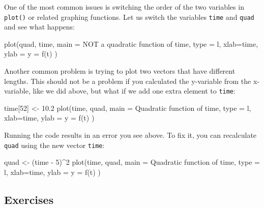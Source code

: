 \documentclass[
  letterpaper,
  DIV=11,
  numbers=noendperiod]{scrreprt}
\newenvironment{Shaded}{\begin{snugshade}}{\end{snugshade}}
\newcommand{\NormalTok}[1]{\textcolor[rgb]{0.00,0.23,0.31}{#1}}
\begin{document}
One of the most common issues is switching the order of the two
variables in \texttt{plot()} or related graphing functions. Let us
switch the variables \texttt{time} and \texttt{quad} and see what
happens:

\begin{Shaded}
\begin{Highlighting}[]
\NormalTok{plot(quad, time, main = \textquotesingle{}NOT a quadratic function of time\textquotesingle{}, type = \textquotesingle{}l\textquotesingle{}, xlab=\textquotesingle{}time\textquotesingle{}, ylab = \textquotesingle{}y = f(t)\textquotesingle{} )}
\end{Highlighting}
\end{Shaded}

Another common problem is trying to plot two vectors that have different
lengths. This should not be a problem if you calculated the y-variable
from the x-variable, like we did above, but what if we add one extra
element to \texttt{time}:

\begin{Shaded}
\begin{Highlighting}[]
\NormalTok{time[52] \textless{}{-} 10.2}
\NormalTok{plot(time, quad, main = \textquotesingle{}Quadratic function of time\textquotesingle{}, type = \textquotesingle{}l\textquotesingle{}, xlab=\textquotesingle{}time\textquotesingle{}, ylab = \textquotesingle{}y = f(t)\textquotesingle{} )}
\end{Highlighting}
\end{Shaded}

Running the code results in an error you see above. To fix it, you can
recalculate \texttt{quad} using the new vector \texttt{time}:

\begin{Shaded}
\begin{Highlighting}[]
\NormalTok{quad \textless{}{-} (time {-} 5)\^{}2}
\NormalTok{plot(time, quad, main = \textquotesingle{}Quadratic function of time\textquotesingle{}, type = \textquotesingle{}l\textquotesingle{}, xlab=\textquotesingle{}time\textquotesingle{}, ylab = \textquotesingle{}y = f(t)\textquotesingle{} )}
\end{Highlighting}
\end{Shaded}

\hypertarget{exercises-6}{%
\subsection*{Exercises}\label{exercises-6}}
\end{document}
